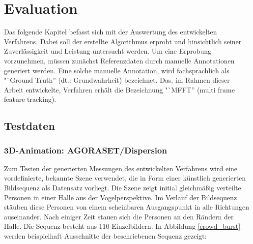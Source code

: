 \chapter{Evaluation}
\label{chap:erg}

Das folgende Kapitel befasst sich mit der Auswertung des entwickelten Verfahrens. Dabei soll der erstellte Algorithmus erprobt und hinsichtlich seiner Zuverlässigkeit und Leistung untersucht werden. Um eine Erprobung vorzunehmen, müssen zunächst Referenzdaten durch manuelle Annotationen generiert werden. Eine solche manuelle Annotation, wird fachsprachlich als "`Ground Truth'' (dt.: Grundwahrheit) bezeichnet. Das, im Rahmen dieser Arbeit entwickelte, Verfahren erhält die Bezeichnung "`MFFT'' (multi frame feature tracking).

\section{Testdaten}
\label{test:data}

\subsection{3D-Animation: AGORASET/Dispersion \cite{CourtyPRL2014} \cite{Allain2012ICPR}}
Zum Testen der generierten Messungen des entwickelten Verfahrens wird eine vordefinierte, bekannte Szene verwendet, die in Form einer künstlich generierten Bildsequenz als Datensatz vorliegt. Die Szene zeigt initial gleichmäßig verteilte Personen in einer Halle aus der Vogelperspektive. Im Verlauf der Bildsequenz stäuben diese Personen von einem scheinbaren Ausgangspunkt in alle Richtungen auseinander. Nach einiger Zeit stauen sich die Personen an den Rändern der Halle. Die Sequenz besteht aus 110 Einzelbildern. In Abbildung \ref{crowd_burst} werden beispielhaft Ausschnitte der beschriebenen Sequenz gezeigt:

